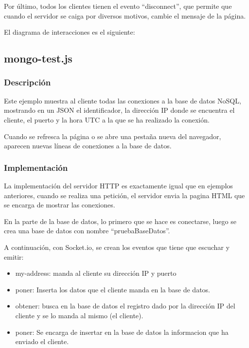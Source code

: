 \documentclass{article}
\begin{document}
Por último, todos los clientes tienen el evento ``disconnect'', que permite que cuando el servidor se caiga por diversos motivos, cambie el mensaje de la página.


El diagrama de interacciones es el siguiente:

\subsection{mongo-test.js}
\subsubsection{Descripción}
Este ejemplo muestra al cliente todas las conexiones a la base de datos NoSQL, mostrando en un JSON el identificador, la dirección IP donde se encuentra el cliente, el puerto y la hora UTC a la que se ha realizado la conexión.

Cuando se refresca la página o se abre una pestaña nueva del navegador, aparecen nuevas líneas de conexiones a la base de datos.


\subsubsection{Implementación}
La implementación del servidor HTTP es exactamente igual que en ejemplos anteriores, cuando se realiza una petición, el servidor envia la pagina HTML que se encarga de mostrar las conexiones.

En la parte de la base de datos, lo primero que se hace es conectarse, luego se crea una base de datos con nombre ``pruebaBaseDatos''.

A continuación, con Socket.io, se crean los eventos que tiene que escuchar y emitir: 

\begin{itemize}
    \item my-address: manda al cliente su dirección IP y puerto
    \item poner: Inserta los datos que el cliente manda en la base de datos.
    \item obtener: busca en la base de datos el registro dado por la dirección IP del cliente y se lo manda al mismo (el cliente).
    \item poner: Se encarga de insertar en la base de datos la informacion que ha enviado el cliente.
\end{itemize}
\end{document}
